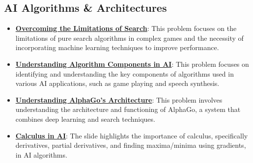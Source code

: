\documentclass{article}%
\begin{document}
\subsection{AI Algorithms \& Architectures}%
\label{subsec:AIAlgorithmsArchitectures}%
\begin{itemize}[leftmargin=*]%
\item \href{\url{https://purdue.brightspace.com/d2l/common/assets/pdfjs-d2l-dist/1.0.14-legacy/web/viewer.html?file=\%252Fcontent\%252Fenforced\%252F1095467-wl.202510.CS.24300.001\%252F02L2-Intro.pdf\%253Fou\%253D1095467\&lang=en-us\&container=d2l-fileviewer-rendered-pdf\&fullscreen=d2l-fileviewer-rendered-pdf-dialog\&height=667}#page=12}{\textbf{Overcoming the Limitations of Search}}: This problem focuses on the limitations of pure search algorithms in complex games and the necessity of incorporating machine learning techniques to improve performance.%
\item \href{\url{https://purdue.brightspace.com/d2l/common/assets/pdfjs-d2l-dist/1.0.14-legacy/web/viewer.html?file=\%252Fcontent\%252Fenforced\%252F1095467-wl.202510.CS.24300.001\%252F02L2-Intro.pdf\%253Fou\%253D1095467\&lang=en-us\&container=d2l-fileviewer-rendered-pdf\&fullscreen=d2l-fileviewer-rendered-pdf-dialog\&height=667}#page=24}{\textbf{Understanding Algorithm Components in AI}}: This problem focuses on identifying and understanding the key components of algorithms used in various AI applications, such as game playing and speech synthesis.%
\item \href{\url{https://purdue.brightspace.com/d2l/common/assets/pdfjs-d2l-dist/1.0.14-legacy/web/viewer.html?file=\%252Fcontent\%252Fenforced\%252F1095467-wl.202510.CS.24300.001\%252F02L2-Intro.pdf\%253Fou\%253D1095467\&lang=en-us\&container=d2l-fileviewer-rendered-pdf\&fullscreen=d2l-fileviewer-rendered-pdf-dialog\&height=667}#page=50}{\textbf{Understanding AlphaGo's Architecture}}: This problem involves understanding the architecture and functioning of AlphaGo, a system that combines deep learning and search techniques.%
\item \href{\url{https://purdue.brightspace.com/d2l/common/assets/pdfjs-d2l-dist/1.0.14-legacy/web/viewer.html?file=\%252Fcontent\%252Fenforced\%252F1095467-wl.202510.CS.24300.001\%252F04L1-Linear\%20Algebra\%20Primer.pdf\%253Fou\%253D1095467\&lang=en-us\&container=d2l-fileviewer-rendered-pdf\&fullscreen=d2l-fileviewer-rendered-pdf-dialog\&height=667}#page=19}{\textbf{Calculus in AI}}: The slide highlights the importance of calculus, specifically derivatives, partial derivatives, and finding maxima/minima using gradients, in AI algorithms.%
\end{itemize}
\end{document}
